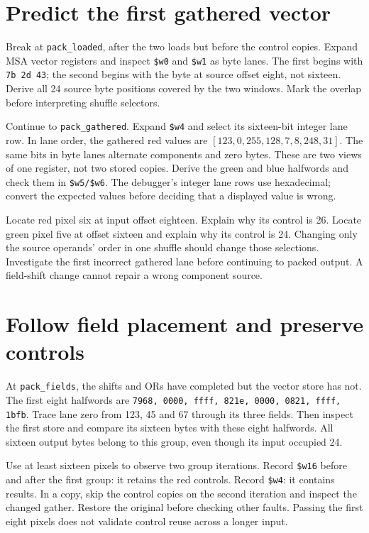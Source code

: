 \section{Predict the first gathered vector}

Break at \texttt{pack\_loaded}, after the two loads but before the control copies.
Expand MSA vector registers and inspect \texttt{\$w0} and \texttt{\$w1} as byte
lanes. The first begins with \texttt{7b 2d 43}; the second begins with the byte at
source offset eight, not sixteen. Derive all 24 source byte positions covered by
the two windows. Mark the overlap before interpreting shuffle selectors.

Continue to \texttt{pack\_gathered}. Expand \texttt{\$w4} and select its
sixteen-bit integer lane row. In lane order, the gathered red values are
$[123,0,255,128,7,8,248,31]$. The same bits in byte lanes alternate components
and zero bytes. These are two views of one register, not two stored copies.
Derive the green and blue halfwords and check them in \texttt{\$w5/\$w6}.
The debugger's integer lane rows use hexadecimal; convert the expected values
before deciding that a displayed value is wrong.

Locate red pixel six at input offset eighteen. Explain why its control is 26.
Locate green pixel five at offset sixteen and explain why its control is 24.
Changing only the source operands' order in one shuffle should change those
selections. Investigate the first incorrect gathered lane before continuing to
packed output. A field-shift change cannot repair a wrong component source.

\section{Follow field placement and preserve controls}

At \texttt{pack\_fields}, the shifts and ORs have completed but the vector store
has not. The first eight halfwords are
\texttt{7968, 0000, ffff, 821e, 0000, 0821, ffff, 1bfb}.
Trace lane zero from 123, 45 and 67 through its three fields. Then inspect the
first store and compare its sixteen bytes with these eight halfwords. All
sixteen output bytes belong to this group, even though its input occupied 24.



Use at least sixteen pixels to observe two group iterations. Record
\texttt{\$w16} before and after the first group: it retains the red controls.
Record \texttt{\$w4}: it contains results. In a copy, skip the control copies on
the second iteration and inspect the changed gather. Restore the original before
checking other faults. Passing the first eight pixels does not validate control
reuse across a longer input.

